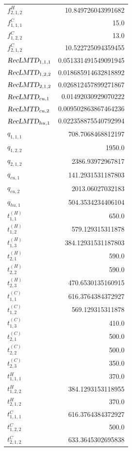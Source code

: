 \documentclass{article}%
\begin{document}
\begin{multicols*}{3}
\begin{supertabular}{lr}
	$f_{2,1,2}^{H}$ & 10.849726043991682 \\%
	$f_{1,1,1}^{C}$ & 15.0 \\%
	$f_{1,2,2}^{C}$ & 13.0 \\%
	$f_{2,1,2}^{C}$ & 10.522725094359455 \\%
	$\textsl{RecLMTD}_{1,1,1}$ & 0.051331491549091945 \\%
	$\textsl{RecLMTD}_{1,2,2}$ & 0.018685914632818892 \\%
	$\textsl{RecLMTD}_{2,1,2}$ & 0.026812457899271867 \\%
	$\textsl{RecLMTD}_{cu,1}$ & 0.01492030929070222 \\%
	$\textsl{RecLMTD}_{cu,2}$ & 0.009502863867464236 \\%
	$\textsl{RecLMTD}_{hu,1}$ & 0.022358875540792994 \\%
	$q_{1,1,1}$ & 708.7068468812197 \\%
	$q_{1,2,2}$ & 1950.0 \\%
	$q_{2,1,2}$ & 2386.93972967817 \\%
	$q_{cu,1}$ & 141.2931531187803 \\%
	$q_{cu,2}$ & 2013.06027032183 \\%
	$q_{hu,1}$ & 504.3534234406104 \\%
	$t_{1,1}^{(H)}$ & 650.0 \\%
	$t_{1,2}^{(H)}$ & 579.129315311878 \\%
	$t_{1,3}^{(H)}$ & 384.12931531187803 \\%
	$t_{2,1}^{(H)}$ & 590.0 \\%
	$t_{2,2}^{(H)}$ & 590.0 \\%
	$t_{2,3}^{(H)}$ & 470.6530135160915 \\%
	$t_{1,1}^{(C)}$ & 616.3764384372927 \\%
	$t_{1,2}^{(C)}$ & 569.129315311878 \\%
	$t_{1,3}^{(C)}$ & 410.0 \\%
	$t_{2,1}^{(C)}$ & 500.0 \\%
	$t_{2,2}^{(C)}$ & 500.0 \\%
	$t_{2,3}^{(C)}$ & 350.0 \\%
	$t_{1,1,1}^{H}$ & 370.0 \\%
	$t_{1,2,2}^{H}$ & 384.1293153118955 \\%
	$t_{2,1,2}^{H}$ & 370.0 \\%
	$t_{1,1,1}^{C}$ & 616.3764384372927 \\%
	$t_{1,2,2}^{C}$ & 500.0 \\%
	$t_{2,1,2}^{C}$ & 633.3645302695838 \\%

\end{supertabular}
\end{multicols*}
\end{document}
